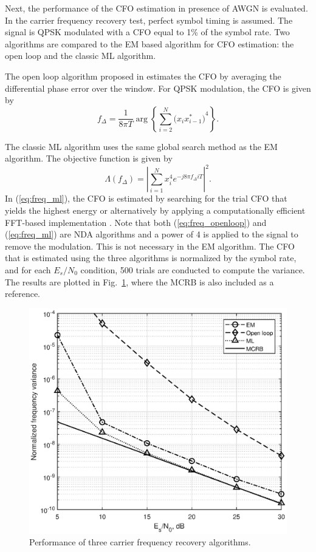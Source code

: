 \documentclass[12pt, draftclsnofoot, onecolumn]{IEEEtran}
\begin{document}

Next, the performance of the CFO estimation in presence of AWGN is evaluated.
In the carrier frequency recovery test, perfect symbol timing is assumed.
The signal is QPSK modulated with a CFO equal to 1\% of the symbol rate.
Two algorithms are compared to the EM based algorithm for CFO estimation:
the open loop and the classic ML algorithm.

The open loop algorithm proposed in \cite{Chuang1991} estimates the CFO  by averaging the differential phase error over the window.
For QPSK modulation, the CFO is given by \cite{mengali1997synchronization}
\begin{equation}
f_\Delta = \frac{1}{8 \pi T} \arg \left\{ {\sum\limits_{i = 2}^{{N} } {{{\big( {x_i x^*_{i-1}} \big)}^4}} } \right\}.
\label{eq:freq_openloop}
\end{equation}

The classic ML algorithm uses the same global search method as the EM algorithm.
The objective function is given by 
\begin{equation}
\Lambda (f_\Delta)=\left| \sum\limits_{i = 1}^N {{{ {{x^4_i}e^{-j8\pi f_\Delta i T}}}}} \right|^2. 
\label{eq:freq_ml}
\end{equation}
In (\ref{eq:freq_ml}), the CFO is estimated by searching for the trial CFO that yields the highest energy or alternatively by applying a computationally efficient FFT-based implementation \cite{Wang2004}.
Note that both (\ref{eq:freq_openloop}) and (\ref{eq:freq_ml}) are NDA algorithms and a power of 4 is applied to the signal to remove the modulation.
This is not necessary in the EM algorithm.
The CFO that is estimated using the three algorithms is normalized by the symbol rate,
and for each \(E_s/N_0\) condition, 500 trials are conducted to compute the variance.
The results are plotted in Fig.~\ref{fig:per_freq}, where the MCRB is also included as a reference.

\begin{figure}[ht]
\centering
\includegraphics[width=3 in]{pic/per_freq-k.eps}
\caption{Performance of three carrier frequency recovery algorithms.}
\label{fig:per_freq} 
\end{figure} 
\end{document}
